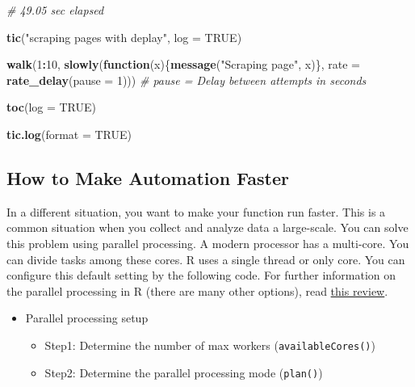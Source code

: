 \documentclass[
]{book}
\newenvironment{Shaded}{\begin{snugshade}}{\end{snugshade}}
\newcommand{\CommentTok}[1]{\textcolor[rgb]{0.56,0.35,0.01}{\textit{#1}}}
\newcommand{\ControlFlowTok}[1]{\textcolor[rgb]{0.13,0.29,0.53}{\textbf{#1}}}
\newcommand{\DataTypeTok}[1]{\textcolor[rgb]{0.13,0.29,0.53}{#1}}
\newcommand{\DecValTok}[1]{\textcolor[rgb]{0.00,0.00,0.81}{#1}}
\newcommand{\KeywordTok}[1]{\textcolor[rgb]{0.13,0.29,0.53}{\textbf{#1}}}
\newcommand{\NormalTok}[1]{#1}
\newcommand{\OperatorTok}[1]{\textcolor[rgb]{0.81,0.36,0.00}{\textbf{#1}}}
\newcommand{\OtherTok}[1]{\textcolor[rgb]{0.56,0.35,0.01}{#1}}
\newcommand{\StringTok}[1]{\textcolor[rgb]{0.31,0.60,0.02}{#1}}
\begin{document}
\begin{Shaded}
\begin{Highlighting}[]
\CommentTok{\# 49.05 sec elapsed}

\KeywordTok{tic}\NormalTok{(}\StringTok{"scraping pages with deplay"}\NormalTok{, }\DataTypeTok{log =} \OtherTok{TRUE}\NormalTok{)}

\KeywordTok{walk}\NormalTok{(}\DecValTok{1}\OperatorTok{:}\DecValTok{10}\NormalTok{, }\KeywordTok{slowly}\NormalTok{(}\ControlFlowTok{function}\NormalTok{(x)\{}\KeywordTok{message}\NormalTok{(}\StringTok{"Scraping page"}\NormalTok{, x)\},   }
                    \DataTypeTok{rate =} \KeywordTok{rate\_delay}\NormalTok{(}\DataTypeTok{pause =} \DecValTok{1}\NormalTok{))) }\CommentTok{\# pause = Delay between attempts in seconds}

\KeywordTok{toc}\NormalTok{(}\DataTypeTok{log =} \OtherTok{TRUE}\NormalTok{)}

\KeywordTok{tic.log}\NormalTok{(}\DataTypeTok{format =} \OtherTok{TRUE}\NormalTok{)}
\end{Highlighting}
\end{Shaded}

\hypertarget{how-to-make-automation-faster}{%
\subsection{How to Make Automation Faster}\label{how-to-make-automation-faster}}

In a different situation, you want to make your function run faster. This is a common situation when you collect and analyze data a large-scale. You can solve this problem using parallel processing. A modern processor has a multi-core. You can divide tasks among these cores. R uses a single thread or only core. You can configure this default setting by the following code. For further information on the parallel processing in R (there are many other options), read \href{https://yxue-me.com/post/2019-05-12-a-glossary-of-parallel-computing-packages-in-r-2019/}{this review}.

\begin{itemize}
\item
  Parallel processing setup

  \begin{itemize}
  \item
    Step1: Determine the number of max workers (\texttt{availableCores()})
  \item
    Step2: Determine the parallel processing mode (\texttt{plan()})
  \end{itemize}
\end{itemize}
\end{document}
